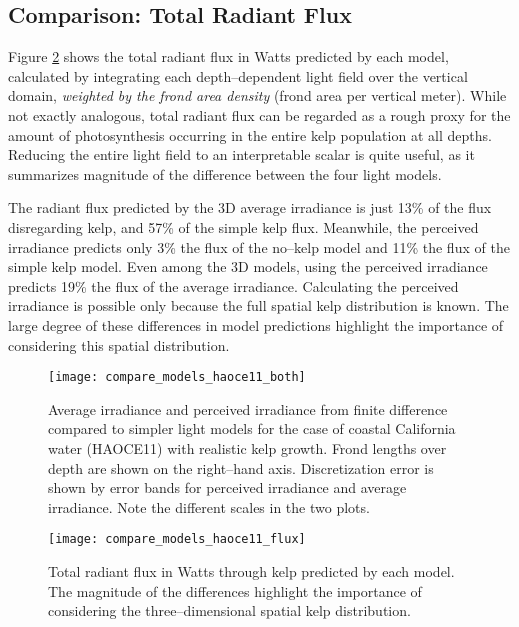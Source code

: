 \subsection{Comparison: Total Radiant Flux}
Figure \ref{fig:compare_models_haoce11_flux} shows the total radiant flux in Watts predicted by each model, calculated by integrating each depth--dependent light field over the vertical domain, \textit{weighted by the frond area density} (frond area per vertical meter).
While not exactly analogous, total radiant flux can be regarded as a rough proxy for the amount of photosynthesis occurring in the entire kelp population at all depths.
Reducing the entire light field to an interpretable scalar is quite useful, as it summarizes magnitude of the difference between the four light models.

The radiant flux predicted by the 3D average irradiance is just 13\% of the flux disregarding kelp, and 57\% of the simple kelp flux.
Meanwhile, the perceived irradiance predicts only 3\% the flux of the no--kelp model and 11\% the flux of the simple kelp model.
Even among the 3D models, using the perceived irradiance predicts 19\% the flux of the average irradiance.
Calculating the perceived irradiance is possible only because the full spatial kelp distribution is known.
The large degree of these differences in model predictions highlight the importance of considering this spatial distribution.

\begin{figure}[H]
  \centering
  \texttt{[image: compare\_models\_haoce11\_both]}
  \caption{Average irradiance and perceived irradiance from finite difference compared to simpler light models for the case of coastal California water (HAOCE11) with realistic kelp growth. Frond lengths over depth are shown on the right--hand axis. Discretization error is shown by error bands for perceived irradiance and average irradiance. Note the different scales in the two plots.}
  \label{fig:compare_models_haoce11_both}
\end{figure}

\begin{figure}[H]
  \centering
  \texttt{[image: compare\_models\_haoce11\_flux]}
  \caption{Total radiant flux in Watts through kelp predicted by each model. The magnitude of the differences highlight the importance of considering the three--dimensional spatial kelp distribution.}
  \label{fig:compare_models_haoce11_flux}
\end{figure}

